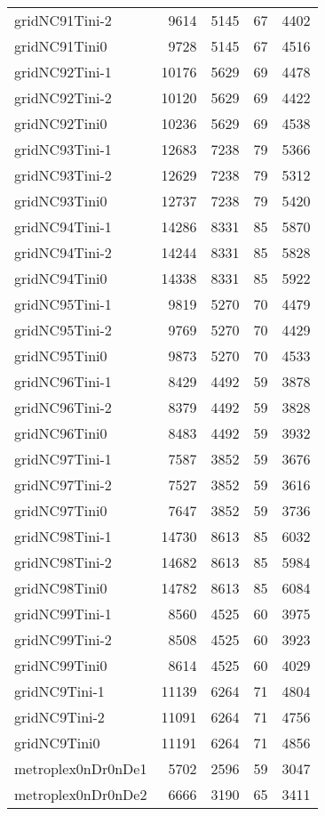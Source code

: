 \begin{longtable}{lrrrr}
gridNC91Tini-2 & 9614 & 5145 & 67 & 4402 \\
gridNC91Tini0 & 9728 & 5145 & 67 & 4516 \\
gridNC92Tini-1 & 10176 & 5629 & 69 & 4478 \\
gridNC92Tini-2 & 10120 & 5629 & 69 & 4422 \\
gridNC92Tini0 & 10236 & 5629 & 69 & 4538 \\
gridNC93Tini-1 & 12683 & 7238 & 79 & 5366 \\
gridNC93Tini-2 & 12629 & 7238 & 79 & 5312 \\
gridNC93Tini0 & 12737 & 7238 & 79 & 5420 \\
gridNC94Tini-1 & 14286 & 8331 & 85 & 5870 \\
gridNC94Tini-2 & 14244 & 8331 & 85 & 5828 \\
gridNC94Tini0 & 14338 & 8331 & 85 & 5922 \\
gridNC95Tini-1 & 9819 & 5270 & 70 & 4479 \\
gridNC95Tini-2 & 9769 & 5270 & 70 & 4429 \\
gridNC95Tini0 & 9873 & 5270 & 70 & 4533 \\
gridNC96Tini-1 & 8429 & 4492 & 59 & 3878 \\
gridNC96Tini-2 & 8379 & 4492 & 59 & 3828 \\
gridNC96Tini0 & 8483 & 4492 & 59 & 3932 \\
gridNC97Tini-1 & 7587 & 3852 & 59 & 3676 \\
gridNC97Tini-2 & 7527 & 3852 & 59 & 3616 \\
gridNC97Tini0 & 7647 & 3852 & 59 & 3736 \\
gridNC98Tini-1 & 14730 & 8613 & 85 & 6032 \\
gridNC98Tini-2 & 14682 & 8613 & 85 & 5984 \\
gridNC98Tini0 & 14782 & 8613 & 85 & 6084 \\
gridNC99Tini-1 & 8560 & 4525 & 60 & 3975 \\
gridNC99Tini-2 & 8508 & 4525 & 60 & 3923 \\
gridNC99Tini0 & 8614 & 4525 & 60 & 4029 \\
gridNC9Tini-1 & 11139 & 6264 & 71 & 4804 \\
gridNC9Tini-2 & 11091 & 6264 & 71 & 4756 \\
gridNC9Tini0 & 11191 & 6264 & 71 & 4856 \\
metroplex0nDr0nDe1 & 5702 & 2596 & 59 & 3047 \\
metroplex0nDr0nDe2 & 6666 & 3190 & 65 & 3411 \\

\end{longtable}
